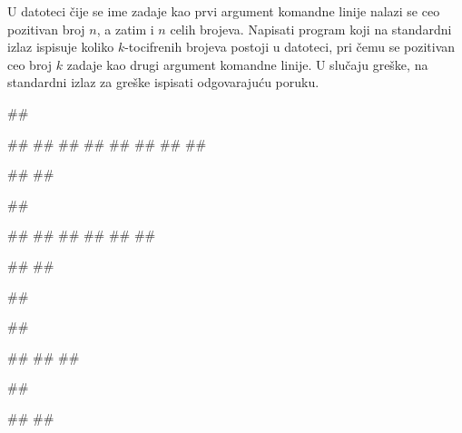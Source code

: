 




\begin{Exercise}[label=v3_03] 
U datoteci čije se ime zadaje kao prvi argument komandne linije
nalazi se ceo pozitivan broj $n$, a zatim i $n$ celih brojeva. Napisati program koji
na standardni izlaz ispisuje 
koliko $k$-tocifrenih brojeva postoji u datoteci, pri čemu se
pozitivan ceo broj $k$ zadaje kao drugi argument komandne linije.
U slučaju greške, na standardni izlaz za greške ispisati odgovarajuću poruku.

\begin{miditest}
\begin{upotreba}{1}
##

##
##
##
##
##
##
##
##

#\naslovIzlaz#
##
\end{upotreba}
\end{miditest}
\begin{miditest}
\begin{upotreba}{2}
##

##
##
##
##
##
##

#\naslovIzlaz#
##
\end{upotreba}
\end{miditest}

\begin{miditest}
\begin{upotreba}{3}
##

##

#\naslovIzlazZaGresku#
##
##
\end{upotreba}
\end{miditest}
\begin{miditest}
\begin{upotreba}{4}
##

#\naslovIzlazZaGresku#
##
\end{upotreba}
\end{miditest}
\end{Exercise}
\begin{Answer}[ref=v3_03]
\end{Answer}


